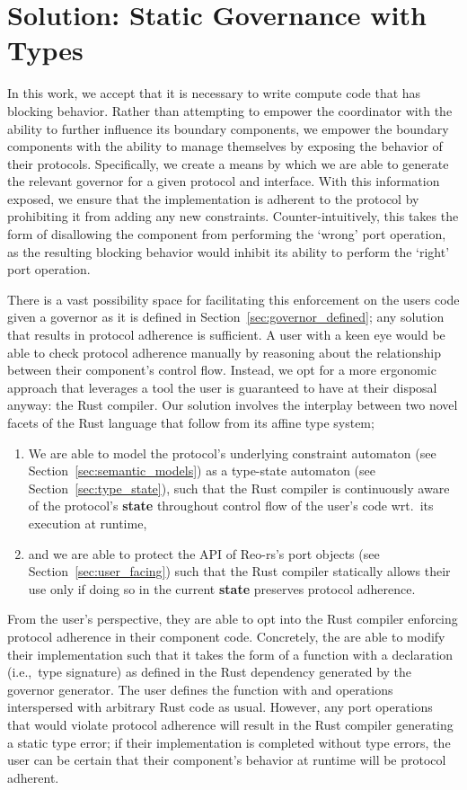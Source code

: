 \section{Solution: Static Governance with Types}
\label{sec:soluition_static_governance}
In this work, we accept that it is necessary to write compute code that has blocking behavior. Rather than attempting to empower the coordinator with the ability to further influence its boundary components, we empower the boundary components with the ability to manage themselves by exposing the behavior of their protocols. Specifically, we create a means by which we are able to generate the relevant governor for a given protocol and interface. With this information exposed, we ensure that the implementation is adherent to the protocol by prohibiting it from adding any new constraints. Counter-intuitively, this takes the form of disallowing the component from performing the `wrong' port operation, as the resulting blocking behavior would inhibit its ability to perform the `right' port operation.

There is a vast possibility space for facilitating this enforcement on the users code given a governor as it is defined in Section~\ref{sec:governor_defined}; any solution that results in protocol adherence is sufficient. A user with a keen eye would be able to check protocol adherence manually by reasoning about the relationship between their component's control flow. Instead, we opt for a more ergonomic approach that leverages a tool the user is guaranteed to have at their disposal anyway: the Rust compiler. Our solution involves the interplay between two novel facets of the Rust language that follow from its affine type system; 
\begin{enumerate}
	\item We are able to model the protocol's underlying constraint automaton (see Section~\ref{sec:semantic_models}) as a type-state automaton (see Section~\ref{sec:type_state}), such that the Rust compiler is continuously aware of the protocol's \textbf{state} throughout control flow of the user's code wrt.\ its execution at runtime,
	
	\item and we are able to protect the API of Reo-rs's port objects (see Section~\ref{sec:user_facing}) such that the Rust compiler statically allows their use only if doing so in the current \textbf{state} preserves protocol adherence.
\end{enumerate}

From the user's perspective, they are able to opt into the Rust compiler enforcing protocol adherence in their component code. Concretely, the are able to modify their implementation such that it takes the form of a function with a declaration (i.e.,\ type signature) as defined in the Rust dependency generated by the governor generator. The user defines the function with  and  operations interspersed with arbitrary Rust code as usual. However, any port operations that would violate protocol adherence will result in the Rust compiler generating a static type error; if their implementation is completed without type errors, the user can be certain that their component's behavior at runtime will be protocol adherent.

